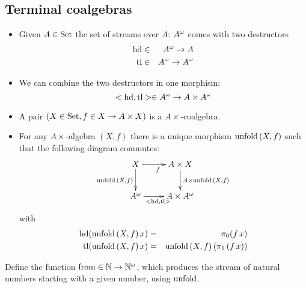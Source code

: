 \documentclass[handout]{beamer}
\begin{document}
\subsection{Terminal coalgebras}

\begin{frame}
  \begin{itemize}
  \item Given $A\in\mathrm{Set}$ the set of streams over $A$: ${A}^\omega$ comes with two destructors
    \begin{eqnarray*}
      \mathrm{hd} & \in & {A}^\omega \to A\\
      \mathrm{tl} & \in & {A}^\omega \to {A}^\omega 
    \end{eqnarray*}

  \item We can combine the two destructors in one morphism:
    \[ <\mathrm{hd},\mathrm{tl}> \in {A}^\omega \to A\times {A}^\omega \]


  \item A pair $(X\in\mathrm{Set},f\in X \to A\times X)$ is a $A\times$-coalgebra.

  \end{itemize}
\end{frame}

\begin{frame}

  \begin{itemize}
  \item For any $A\times$-algebra $(X,f)$ there is a unique morphism
    $\mathrm{unfold}\,(X,f)$ such that the following diagram commutes:
    \[ \xymatrix{
      X\ar[d]_{\unfold\,(X,f)} \ar[r]_f & A\times X\ar[d]^{A\times\unfold\,(X,f)} \\
      \Stream{A} \ar[r]_{<\mathrm{hd},\mathrm{tl}>}  & A \times\Stream{A} 
    } \]
    with
    \begin{eqnarray*}
      \mathrm{hd}(\mathrm{unfold}\,(X,f)\,x) & = & \pi_0 (f\,x) \\
      \mathrm{tl}(\mathrm{unfold}\,(X,f)\,x) & = & \mathrm{unfold}\,(X,f)\,(\pi_1\,(f\,x))
    \end{eqnarray*}

  \end{itemize}

  \begin{exercise}
    Define the function $\mathrm{from}\in \mathbb{N} \to {\mathbb{N}}^\omega$, which produces
    the stream of natural numbers starting with a given number, using $\mathrm{unfold}$.
    
  \end{exercise}

\end{frame}
\end{document}
